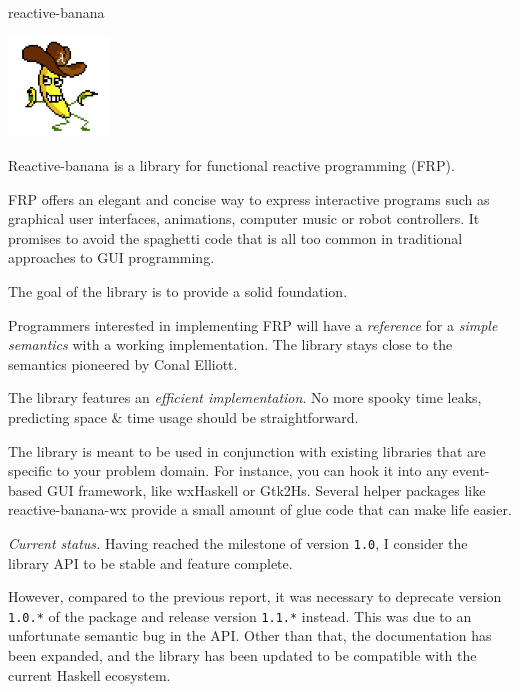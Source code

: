 \begin{hcarentry}{reactive-banana}
\makeheader

\begin{center}
\includegraphics[width=0.2\textwidth]{html/banana.jpg}
\end{center}

Reactive-banana is a library for functional reactive programming (FRP).

FRP offers an elegant and concise way to express interactive programs such as
graphical user interfaces, animations, computer music or robot controllers. It
promises to avoid the spaghetti code that is all too common in traditional
approaches to GUI programming.

The goal of the library is to provide a solid foundation.
\begin{compactitem}
\item Programmers interested in implementing FRP will have a \emph{reference}
  for a \emph{simple semantics} with a working implementation. The library
  stays close to the semantics pioneered by Conal Elliott.
\item The library features an \emph{efficient implementation}. No more spooky
  time leaks, predicting space \& time usage should be straightforward.
\end{compactitem}

The library is meant to be used in conjunction with existing libraries that
are specific to your problem domain. For instance, you can hook it into any
event-based GUI framework, like wxHaskell or Gtk2Hs. Several helper packages
like reactive-banana-wx provide a small amount of glue code that can make life
easier.

\emph{Current status.}
Having reached the milestone of version \verb!1.0!,
I consider the library API to be stable and feature complete.

However, compared to the previous report, it was necessary to deprecate version \verb!1.0.*! of the package and release version \verb!1.1.*! instead. This was due to an unfortunate semantic bug in the API. Other than that, the documentation has been expanded, and the library has been updated to be compatible with the current Haskell ecosystem.


\end{hcarentry}
